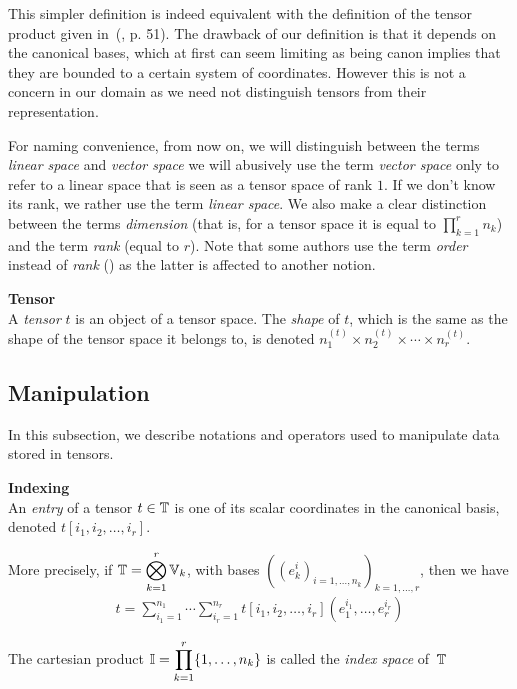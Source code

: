 \begin{remark}
This simpler definition is indeed equivalent with the definition of the tensor product given in~(\cite{hackbusch2012tensor}, p. 51). The drawback of our definition is that it depends on the canonical bases, which at first can seem limiting as being canon implies that they are bounded to a certain system of coordinates. However this is not a concern in our domain as we need not distinguish tensors from their representation.
\end{remark}

\begin{remark}
For naming convenience, from now on, we will distinguish between the terms \emph{linear space} and \emph{vector space} \ie we will abusively use the term \emph{vector space} only to refer to a linear space that is seen as a tensor space of rank $1$. If we don't know its rank, we rather use the term \emph{linear space}.
We also make a clear distinction between the terms \emph{dimension} (that is, for a tensor space it is equal to $\displaystyle \prod_{k=1}^r n_k$) and the term \emph{rank} (equal to $r$). Note that some authors use the term \emph{order} instead of \emph{rank} (\eg \cite{hackbusch2012tensor}) as the latter is affected to another notion.
\end{remark}

\begin{definition}\textbf{Tensor}\\
A \emph{tensor} $t$ is an object of a tensor space. The \emph{shape} of $t$, which is the same as the shape of the tensor space it belongs to, is denoted $n_1^{(t)} \times n_2^{(t)} \times \cdots \times n_r^{(t)}$.
\end{definition}

%
\subsection{Manipulation}

In this subsection, we describe notations and operators used to manipulate data stored in tensors.

\begin{definition}\textbf{Indexing}\\
An \emph{entry} of a tensor $t \in \mathbb{T}$ is one of its scalar coordinates in the canonical basis, denoted $t[i_1, i_2, \ldots, i_r]$.

More precisely, if $\mathbb{T} = \displaystyle \bigotimes_{k=1}^r \mathbb{V}_k$, with bases $((e_k^i)_{i=1,\ldots,n_k})_{k=1,\ldots,r}$, then we have
\begin{gather*}
t =  \displaystyle \sum_{i_1=1}^{n_1} \cdots \sum_{i_r=1}^{n_r} t[i_1, i_2, \ldots, i_r] (e_1^{i_1}, \ldots, e_r^{i_r})
\end{gather*}

The cartesian product $\mathbb{I}=\displaystyle \prod_{k=1}^r \{1, \ldots, n_k \}$ is called the \emph{index space} of~$\mathbb{T}$
\end{definition}

